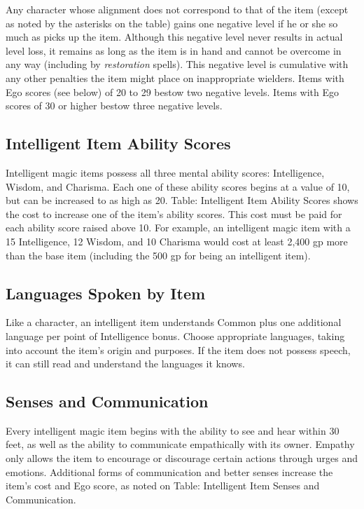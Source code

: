 Any character whose alignment does not correspond to that of the item (except as noted by the asterisks on the table) gains one negative level if he or she so much as picks up the item. Although this negative level never results in actual level loss, it remains as long as the item is in hand and cannot be overcome in any way (including by \textit{restoration }spells). This negative level is cumulative with any other penalties the item might place on inappropriate wielders. Items with Ego scores (see below) of 20 to 29 bestow two negative levels. Items with Ego scores of 30 or higher bestow three negative levels.
				
\subsection{Intelligent Item Ability Scores}

				
Intelligent magic items possess all three mental ability scores: Intelligence, Wisdom, and Charisma. Each one of these ability scores begins at a value of 10, but can be increased to as high as 20. Table: Intelligent Item Ability Scores shows the cost to increase one of the item's ability scores. This cost must be paid for each ability score raised above 10. For example, an intelligent magic item with a 15 Intelligence, 12 Wisdom, and 10 Charisma would cost at least 2,400 gp more than the base item (including the 500 gp for being an intelligent item). 
				
\subsection{Languages Spoken by Item}

				
Like a character, an intelligent item understands Common plus one additional language per point of Intelligence bonus. Choose appropriate languages, taking into account the item's origin and purposes. If the item does not possess speech, it can still read and understand the languages it knows.
				
\subsection{Senses and Communication}

				
Every intelligent magic item begins with the ability to see and hear within 30 feet, as well as the ability to communicate empathically with its owner. Empathy only allows the item to encourage or discourage certain actions through urges and emotions. Additional forms of communication and better senses increase the item's cost and Ego score, as noted on Table: Intelligent Item Senses and Communication.
				
